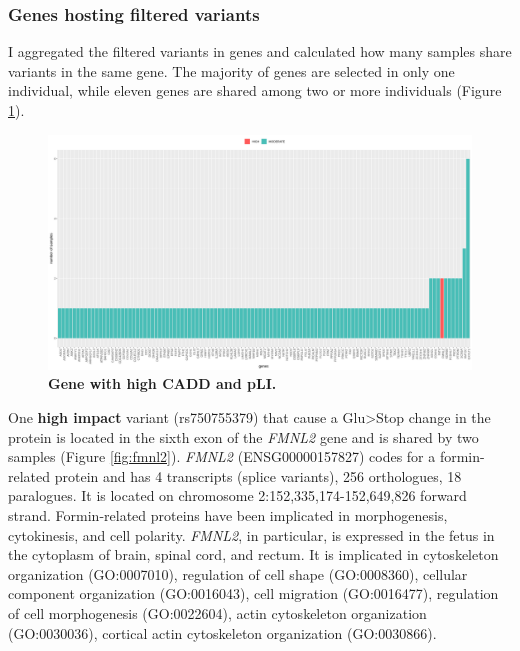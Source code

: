\subsubsection{Genes hosting filtered variants }
I aggregated the filtered variants in genes and calculated how many samples share variants in the same gene. The majority of genes are selected in only one  individual, while eleven genes are shared among two or more individuals  (Figure \ref{fig:geneCADDpLI}).\\

\vspace{1,5cm}

\begin{figure}[H]
\centering
\includegraphics[width=1\textwidth]{fig/all_hetero_cadd_pli.png}
\decoRule
\caption{\textbf{Gene with high CADD and pLI.}}
\label{fig:geneCADDpLI}
\end{figure}

\vspace{1cm}

One \textbf{high impact} variant (rs750755379) that cause a Glu>Stop change in the protein is located in the sixth exon of the \textit{FMNL2} gene and is shared by two samples (Figure \ref{fig:fmnl2}). \textit{FMNL2} (ENSG00000157827) codes for a formin-related protein and has 4 transcripts (splice variants), 256 orthologues, 18 paralogues. It is located on chromosome 2:152,335,174-152,649,826 forward strand. Formin-related proteins have been implicated in morphogenesis, cytokinesis, and cell polarity. \textit{FMNL2}, in particular, is expressed in the fetus in the cytoplasm of brain, spinal cord, and rectum\cite{lizio2015gateways}. It is implicated in cytoskeleton organization (GO:0007010), regulation of cell shape (GO:0008360), cellular component organization (GO:0016043), cell migration (GO:0016477), regulation of cell morphogenesis (GO:0022604), actin cytoskeleton organization (GO:0030036), cortical actin cytoskeleton organization (GO:0030866). \\

